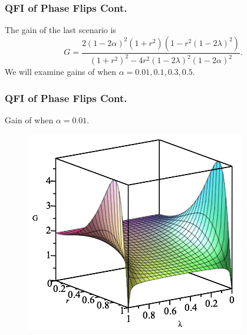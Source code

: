 \documentclass{beamer}
\begin{document}
\begin{frame}
\frametitle{QFI of Phase Flips Cont.}
The gain of the last scenario is
\begin{equation}\label{eq:42}
G=\frac{2(1-2\alpha)^2(1+r^2)(1-r^2(1-2\lambda)^2)}{(1+r^2)^2-4r^2(1-2\lambda)^2(1-2\alpha)^2}.
\end{equation}
We will examine gains of when $\alpha=0.01, 0.1, 0.3, 0.5$.
\end{frame}
\begin{frame}
\frametitle{QFI of Phase Flips Cont.}
Gain of when $\alpha=0.01$.
\begin{figure}
\begin{center}
\includegraphics[width=0.75\linewidth]{Phase-Flip-Two-Channel-Alpha=001-Gain.png}
\end{center}
\end{figure}
\end{frame}
\end{document}
